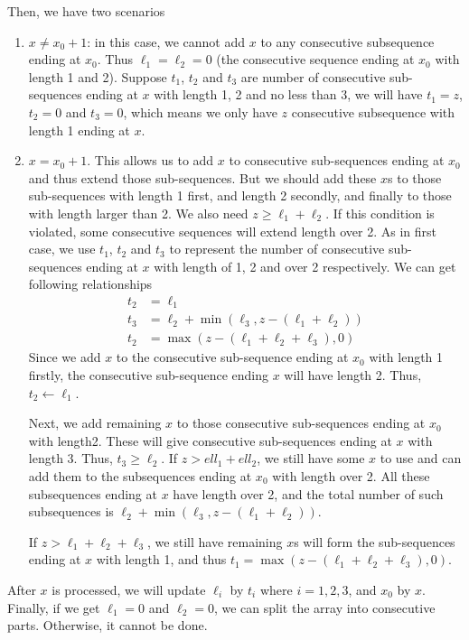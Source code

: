 Then, we have two scenarios
\begin{enumerate}
    \item $x\neq x_0+1$: in this case, we cannot add $x$ to any consecutive subsequence ending at $x_0$. Thus $\ell_1=\ell_2=0$ (the consecutive sequence ending at $x_0$ with length 1 and 2). Suppose $t_1$, $t_2$ and $t_3$ are number of consecutive sub-sequences ending at $x$ with length 1, 2 and no less than 3, we will have $t_1=z$, $t_2=0$ and $t_3=0$, which means we only have $z$ consecutive subsequence with length 1 ending at $x$.
    \item $x=x_0+1$. This allows us to add $x$ to consecutive sub-sequences ending at $x_0$ and thus extend those sub-sequences. 
    But we should add these $x$s to those sub-sequences with length 1 first, and length 2 secondly, and finally to those with length larger than 2. We also need $z\geq \ell_1+\ell_2$. If this condition is violated, some consecutive sequences will extend length over 2. 
    As in first case, we use $t_1$, $t_2$ and $t_3$ to represent the number of consecutive sub-sequences ending at $x$ with length of 1, 2 and over 2 respectively. We can get following relationships
    \begin{align*}
        t_2 &= \ell_1 \\
        t_3 &= \ell_2 + \min(\ell_3, z-(\ell_1+\ell_2)) \\
        t_2 &= \max(z - (\ell_1+\ell_2+\ell_3), 0)
    \end{align*}
    Since we add $x$ to the consecutive sub-sequence ending at $x_0$ with length 1 firstly, the consecutive sub-sequence ending $x$ will have length 2. Thus, $t_2 \gets \ell_1$.
    
    Next, we add remaining $x$ to those consecutive sub-sequences ending at $x_0$ with length2. These will give consecutive sub-sequences ending at $x$ with length 3. Thus, $t_3\geq \ell_2$. If $z > ell_1 + ell_2$, we still have some $x$ to use and can add them to the subsequences ending at $x_0$ with length over 2. All these subsequences ending at $x$ have length over 2, and the total number of such subsequences is $\ell_2 + \min(\ell_3, z - (\ell_1 + \ell_2))$. 
    
    If $z > \ell_1 + \ell_2 + \ell_3$, we still have remaining $x$s will form the sub-sequences ending at $x$ with length 1, and thus $t_1 = \max(z - (\ell_1 + \ell_2 + \ell_3), 0)$.
\end{enumerate}

After $x$ is processed, we will update $\ell_i$ by $t_i$ where $i=1,2,3$, and $x_0$ by $x$. Finally, if we get $\ell_1=0$ and $\ell_2=0$, we can split the array into consecutive parts. Otherwise, it cannot be done.



